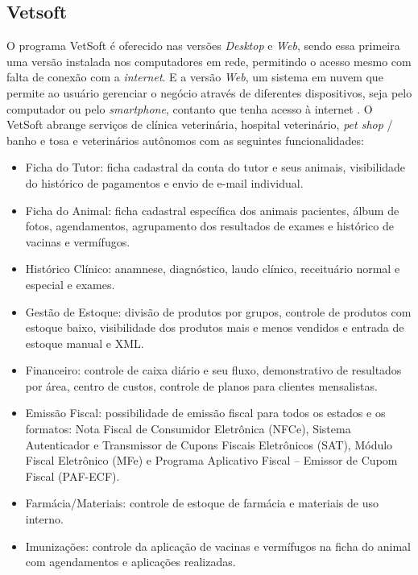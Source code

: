 \documentclass[
    12pt,               %
    openright,          %
    oneside,
    a4paper,            %
    BIBLATEX,           %
    TODO,               %
    english,            %
    brazil              %
    ]{ifsp-spo-inf-ctds}
\begin{document}
        \subsection{Vetsoft}
        O programa VetSoft é oferecido nas versões \emph{Desktop} e \emph{Web}, sendo essa primeira uma versão instalada nos computadores em rede, permitindo o acesso mesmo com falta de conexão com a \emph{internet}. E a versão \emph{Web}, um sistema em nuvem que permite ao usuário gerenciar o negócio através de diferentes dispositivos, seja pelo computador ou pelo \emph{smartphone}, contanto que tenha acesso à internet . O VetSoft abrange serviços de clínica veterinária, hospital veterinário, \emph{pet shop} / banho e tosa e veterinários autônomos com as seguintes funcionalidades:

\begin{itemize}
    \item Ficha do Tutor: ficha cadastral da conta do tutor e seus animais, visibilidade do histórico de pagamentos e envio de e-mail individual.
    \item Ficha do Animal: ficha cadastral específica dos animais pacientes, álbum de fotos, agendamentos, agrupamento dos resultados de exames e histórico de vacinas e vermífugos.
    \item Histórico Clínico: anamnese, diagnóstico, laudo clínico, receituário normal e especial e exames.
    \item Gestão de Estoque: divisão de produtos por grupos, controle de produtos com estoque baixo, visibilidade dos produtos mais e menos vendidos e entrada de estoque manual e XML.
    \item Financeiro: controle de caixa diário e seu fluxo, demonstrativo de resultados por área, centro de custos, controle de planos para clientes mensalistas.
    \item Emissão Fiscal: possibilidade de emissão fiscal para todos os estados e os formatos: Nota Fiscal de Consumidor Eletrônica (NFCe), Sistema Autenticador e Transmissor de Cupons Fiscais Eletrônicos (SAT), Módulo Fiscal Eletrônico (MFe) e Programa Aplicativo Fiscal – Emissor de Cupom Fiscal (PAF-ECF).
    \item Farmácia/Materiais: controle de estoque de farmácia e materiais de uso interno.
    \item Imunizações: controle da aplicação de vacinas e vermífugos na ficha do animal com agendamentos e aplicações realizadas.
\end{itemize}
\end{document}
